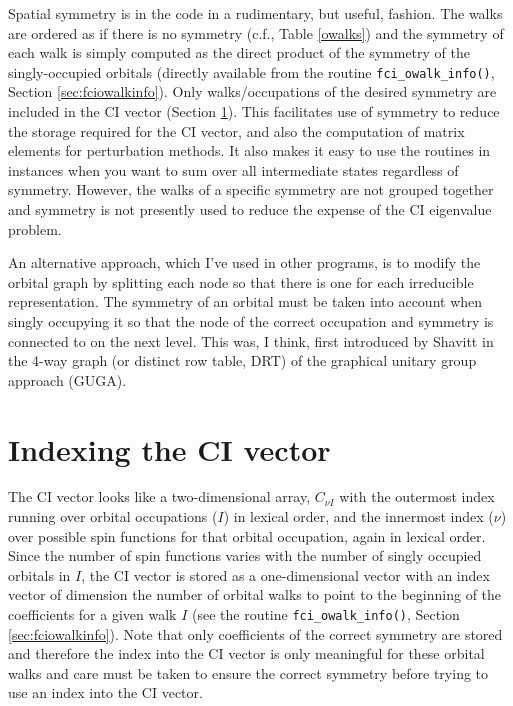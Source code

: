 \documentclass[fullpage,12pt,fleqn]{article}
\begin{document}
Spatial symmetry is in the code in a rudimentary, but useful, fashion.
The walks are ordered as if there is no symmetry (c.f., Table
\ref{owalks}) and the symmetry of each walk is simply computed as the
direct product of the symmetry of the singly-occupied orbitals
(directly available from the routine \verb!fci_owalk_info()!, Section
\ref{sec:fciowalkinfo}).  Only walks/occupations of the desired
symmetry are included in the CI vector (Section \ref{sec:ciindex}).
This facilitates use of symmetry to reduce the storage required for
the CI vector, and also the computation of matrix elements for
perturbation methods.  It also makes it easy to use the routines in
instances when you want to sum over all intermediate states regardless
of symmetry.  However, the walks of a specific symmetry are not
grouped together and symmetry is not presently used to reduce the
expense of the CI eigenvalue problem.

An alternative approach, which I've used in other programs,
is to modify the orbital graph by splitting each node so
that there is one for each irreducible representation.  The symmetry
of an orbital must be taken into account when singly occupying it so
that the node of the correct occupation and symmetry is connected to
on the next level.  This was, I think, first introduced by Shavitt
\cite{shavittguga,shavittguga2} in the 4-way graph (or distinct row
table, DRT) of the graphical unitary group approach (GUGA).

\section{Indexing the CI vector}
\label{sec:ciindex}

The CI vector looks like a two-dimensional array, $C_{\nu I}$ with the
outermost index running over orbital occupations ($I$) in lexical
order, and the innermost index ($\nu$) over possible spin functions
for that orbital occupation, again in lexical order.  Since the number
of spin functions varies with the number of singly occupied orbitals
in $I$, the CI vector is stored as a one-dimensional vector with an
index vector of dimension the number of orbital walks to point to the
beginning of the coefficients for a given walk $I$ (see the routine
\verb!fci_owalk_info()!, Section \ref{sec:fciowalkinfo}).  Note that
only coefficients of the correct symmetry are stored and therefore the
index into the CI vector is only meaningful for these orbital walks
and care must be taken to ensure the correct symmetry before trying to
use an index into the CI vector.
\end{document}
